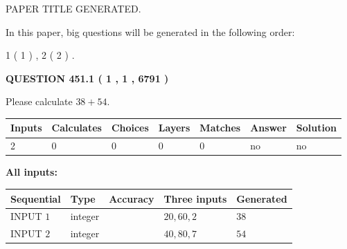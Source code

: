 \documentclass[12pt]{article}
\begin{document}
   
\vspace{0.2in}
   
   
   
   
   
   
   
   
 \vspace{0.2in}
 
 
 
 
   
   
 PAPER TITLE GENERATED.
   
   
   
\vspace{0.2in}
   
In this paper, big questions will be generated in the following order: 
   
   
   1 ( 1 )
 ,
   2 ( 2 )
 .
  
\vspace{0.2in}
  
{\textbf{\Large{QUESTION
451.1 
 ( 1 , 1 , 6791 )
}}}
  
  
 
Please calculate $ %
38 +  %
54 $.
 
 
   
   
   
   
\noindent\begin{tabular}{|l|l|l|l|l|l|l|}
 \hline
Inputs & Calculates & Choices & Layers & Matches & Answer & Solution \\ \hline
 2  & 
 0  & 
 0
  & 
 0  & 
 0  & 
  no & 
  no 
  \\ \hline
 \end{tabular}
   
   
   
   
\noindent{}
   
   
   
   
\noindent\vspace{0.1in}\hspace{-0.08in} {\textbf{\Large{All inputs: }}}
   
   
  
  
\noindent\begin{tabular}{|l|l|l|l|l|}
\hline
 Sequential & Type & Accuracy & Three inputs & Generated \\ 
\hline
 
 
  INPUT $  1 $ & integer &  & $
 20
 , 
 60
 , 
 2
 $ & $ 38 $ 
 \\  \hline  
 
 
  INPUT $  2 $ & integer &  & $
 40
 , 
 80
 , 
 7
 $ & $ 54 $ 
 \\  \hline  
 \end{tabular}
   
\end{document}
